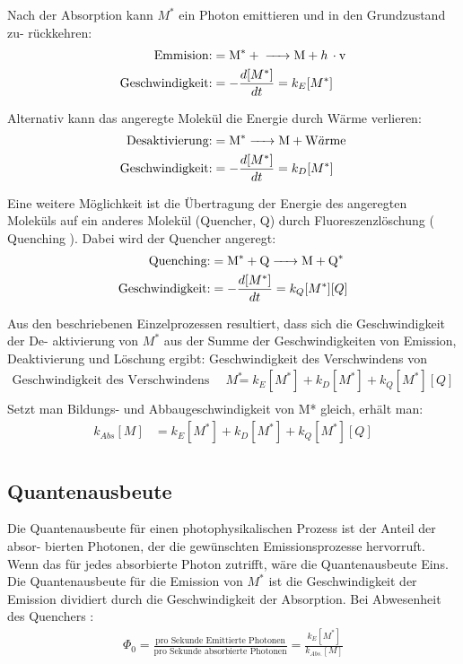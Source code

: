 \documentclass[12pt]{article}
\begin{document}
Nach der Absorption kann $M^*$ ein Photon emittieren und in den Grundzustand zu-
rückkehren:
\begin{align*}
 \text{Emmision:} &= \ce{M^* + -> M +  h \cdot v}\\
 \text{Geschwindigkeit:} &= - \frac{d[M^*]}{dt} = k _{E} [M^*]
\end{align*}

Alternativ kann das angeregte Molekül die Energie durch Wärme verlieren:
\begin{align*}
 \text{Desaktivierung:} &= \ce{M^* -> M +  W\ddot{a}rme}\\
 \text{Geschwindigkeit:} &= - \frac{d[M^*]}{dt} = k _{D} [M^*]
\end{align*}


Eine weitere Möglichkeit ist die Übertragung der Energie des angeregten Moleküls auf ein
anderes Molekül (Quencher, Q) durch Fluoreszenzlöschung ( Quenching ). Dabei wird
der Quencher angeregt:
\begin{align*}
 \text{Quenching:} &= \ce{M^* + Q -> M +  Q^*}\\
 \text{Geschwindigkeit:} &= - \frac{d[M^*]}{dt} = k _{Q} [M^*] [Q]
\end{align*}

Aus den beschriebenen Einzelprozessen resultiert, dass sich die Geschwindigkeit der De-
aktivierung von $M^*$ aus der Summe der Geschwindigkeiten von Emission, Deaktivierung
und Löschung ergibt:
Geschwindigkeit des Verschwindens von
\begin{align*}
 \text{Geschwindigkeit des Verschwindens von } M^* &=  k _{E} [M^*] + k _{D} [M^*] + k _{Q} [M^*] [Q]\\
\end{align*}
Setzt man Bildungs- und Abbaugeschwindigkeit von M* gleich, erhält man:
\begin{align*}
 k_{Abs} [M] &=  k _{E} [M^*] + k _{D} [M^*] + k _{Q} [M^*] [Q]\\
\end{align*}
\subsection{Quantenausbeute\supercite{harris}} %
\label{ssub:quantenausbeute}

\grqq Die Quantenausbeute für einen photophysikalischen Prozess ist der Anteil der absor-
bierten Photonen, der die gewünschten Emissionsprozesse hervorruft. Wenn das für jedes
absorbierte Photon zutrifft, wäre die Quantenausbeute Eins.\grqq
Die Quantenausbeute für die Emission von $M^*$ ist die Geschwindigkeit der Emission
dividiert durch die Geschwindigkeit der Absorption. Bei Abwesenheit des Quenchers :
\begin{align*}
  \Phi _0 = \frac{\text{pro Sekunde Emittierte Photonen}}{\text{pro Sekunde absorbierte Photonen}} = \frac{k_{E} [M^*]}{k_{Abs.} [M]}
\end{align*}
\end{document}

